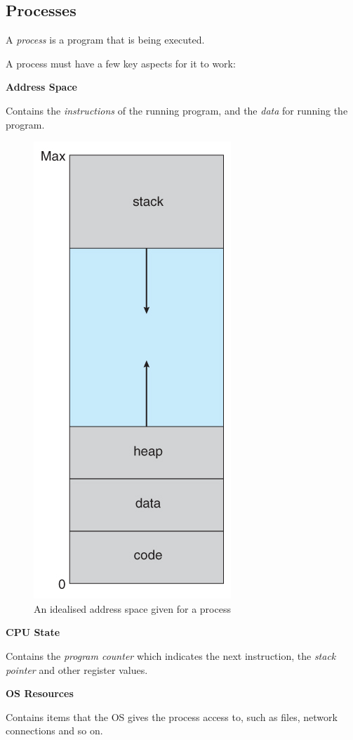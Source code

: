 \documentclass[a4]{article}
\begin{document}
\subsection{Processes}

A \textit{process} is a program that is being executed.

A process must have a few key aspects for it to work:

\begin{framed}
  \textbf{Address Space}

  Contains the \textit{instructions} of the running program, and the \textit{data} for running the program.

  \begin{figure}[H]
    \centering
    \includegraphics[scale=0.64]{addressspace}
    \caption{An idealised address space given for a process}
  \end{figure}

  \textbf{CPU State}

  Contains the \textit{program counter} which indicates the next instruction, the \textit{stack pointer} and other register values.

  \textbf{OS Resources}

  Contains items that the OS gives the process access to, such as files, network connections and so on.
\end{framed}
\end{document}
